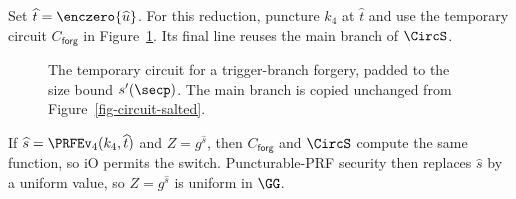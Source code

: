 Set $\widehat t=\enczero{\widehat u}$. For this reduction, puncture $k_4$ at $\widehat t$ and use the temporary circuit $C_{\mathsf{forg}}$ in Figure~\ref{fig-circuit-trigger-forgery}. Its final line reuses the main branch of $\CircS$.

\begin{figure}[t]
\begin{center}
\end{center}
\vspace{-6pt}
\caption{The temporary circuit for a trigger-branch forgery, padded to the size bound $s'(\secp)$. The main branch is copied unchanged from Figure~\ref{fig-circuit-salted}.}\label{fig-circuit-trigger-forgery}
\vspace{-3pt}\hrulefill
\vspace{-1ex}
\end{figure}

If $\widehat s=\PRFEv_4(k_4,\widehat t)$ and $Z=g^{\widehat s}$, then $C_{\mathsf{forg}}$ and $\CircS$ compute the same function, so iO permits the switch. Puncturable-PRF security then replaces $\widehat s$ by a uniform value, so $Z=g^{\widehat s}$ is uniform in $\GG$.

